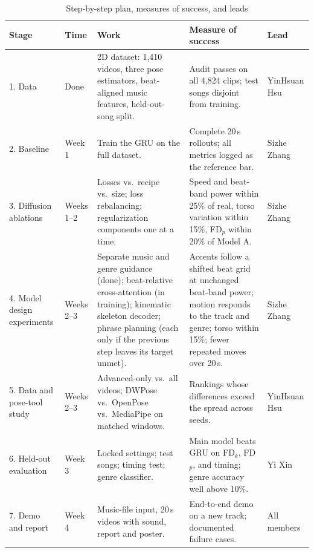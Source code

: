 \documentclass[conference,letterpaper]{IEEEtran}
\begin{document}
\begin{table}[t]
\caption{Step-by-step plan, measures of success, and leads}
\label{tab:plan}
\centering
\begin{tabular}{@{}p{.95in}p{.55in}p{2.55in}p{1.95in}p{.85in}@{}}
\toprule
Stage & Time & Work & Measure of success & Lead \\
\midrule
1. Data & Done & 2D dataset: 1,410 videos, three pose estimators, beat-aligned music features, held-out-song split. & Audit passes on all 4,824 clips; test songs disjoint from training. & YinHsuan Hsu \\
2. Baseline & Week 1 & Train the GRU on the full dataset. & Complete 20\,s rollouts; all metrics logged as the reference bar. & Sizhe Zhang \\
3. Diffusion ablations & Weeks 1--2 & Losses vs.\ recipe vs.\ size; loss rebalancing; regularization components one at a time. & Speed and beat-band power within 25\% of real, torso variation within 15\%, FD$_p$ within 20\% of Model A. & Sizhe Zhang \\
4. Model design experiments & Weeks 2--3 & Separate music and genre guidance (done); beat-relative cross-attention (in training); kinematic skeleton decoder; phrase planning (each only if the previous step leaves its target unmet). & Accents follow a shifted beat grid at unchanged beat-band power; motion responds to the track and genre; torso within 15\%; fewer repeated moves over 20\,s. & Sizhe Zhang \\
5. Data and pose-tool study & Weeks 2--3 & Advanced-only vs.\ all videos; DWPose vs.\ OpenPose vs.\ MediaPipe on matched windows. & Rankings whose differences exceed the spread across seeds. & YinHsuan Hsu \\
6. Held-out evaluation & Week 3 & Locked settings; test songs; timing test; genre classifier. & Main model beats GRU on FD$_k$, FD$_p$, and timing; genre accuracy well above 10\%. & Yi Xin \\
7. Demo and report & Week 4 & Music-file input, 20\,s videos with sound, report and poster. & End-to-end demo on a new track; documented failure cases. & All members \\
\bottomrule
\end{tabular}
\end{table}
\end{document}

